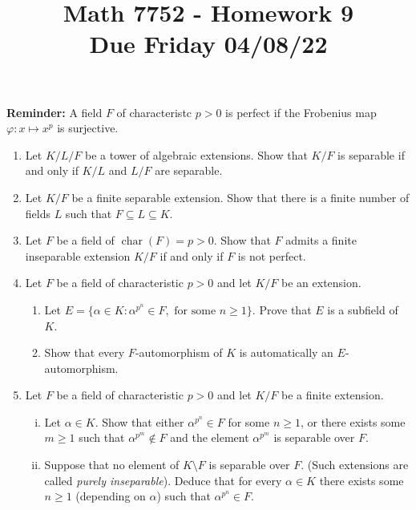 \documentclass[12pt,
psamsfonts]{amsart}
\title{Math 7752 - Homework 9\\
Due Friday 04/08/22}
\theoremstyle{remark}
\theoremstyle{definition}
\DeclareMathOperator{\ch}{char}
\numberwithin{equation}{section}
\begin{document}
\maketitle


\textbf{Reminder:} A field $F$ of characteristc $p>0$ is perfect if the Frobenius map $\varphi:x\mapsto x^p$ is surjective. \\

\begin{enumerate}
\item Let $K/L/F$ be a tower of algebraic extensions. Show that $K/F$ is separable if and only if $K/L$ and $L/F$ are separable. \\
\item Let $K/F$ be a finite separable extension. Show that there is a finite number of fields $L$ such that $F\subseteq L\subseteq K$. \\
\item Let $F$ be a field of $\ch(F)=p>0.$ Show that $F$ admits a finite inseparable extension $K/F$ if and only if $F$ is not perfect. \\
\item Let $F$ be a field of characteristic $p>0$ and let $K/F$ be an extension. 
\begin{enumerate}
\item Let $E=\{\alpha\in K:\alpha^{p^n}\in F,\text{ for some }n\geq 1\}$. Prove that $E$ is a subfield of $K$. 
\item Show that every $F$-automorphism of $K$ is automatically an $E$-automorphism. 
\end{enumerate} 
\medskip 
\medskip 
\item Let $F$ be a field of characteristic $p>0$ and let $K/F$ be a finite extension. 
 \begin{enumerate}
[(i)]\item Let $\alpha\in K$. Show that either $\alpha^{p^n}\in F$ for some $n\geq 1$, or there exists some $m\geq 1$ such that $\alpha^{p^m}\not\in F$ and the element $\alpha^{p^m}$ is separable over $F$. 
\item Suppose that no element of $K\setminus F$ is separable over $F$. (Such extensions are called \textit{purely inseparable}). Deduce that for every $\alpha\in K$ there exists some $n\geq 1$ (depending on $\alpha$) such that $\alpha^{p^n}\in F$. 

\end{enumerate}
\end{enumerate}
\end{document}
